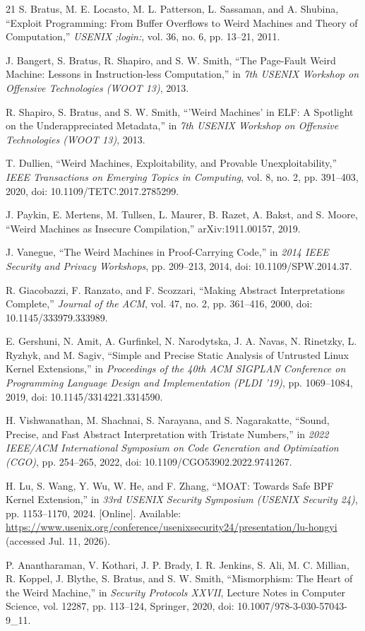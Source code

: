\documentclass[conference]{IEEEtran}
\begin{document}
\begin{thebibliography}{21}
S. Bratus, M. E. Locasto, M. L. Patterson, L. Sassaman, and A. Shubina, ``Exploit Programming: From Buffer Overflows to Weird Machines and Theory of Computation,'' \emph{USENIX ;login:}, vol. 36, no. 6, pp. 13--21, 2011.

J. Bangert, S. Bratus, R. Shapiro, and S. W. Smith, ``The Page-Fault Weird Machine: Lessons in Instruction-less Computation,'' in \emph{7th USENIX Workshop on Offensive Technologies (WOOT 13)}, 2013.

R. Shapiro, S. Bratus, and S. W. Smith, ``'Weird Machines' in ELF: A Spotlight on the Underappreciated Metadata,'' in \emph{7th USENIX Workshop on Offensive Technologies (WOOT 13)}, 2013.

T. Dullien, ``Weird Machines, Exploitability, and Provable Unexploitability,'' \emph{IEEE Transactions on Emerging Topics in Computing}, vol. 8, no. 2, pp. 391--403, 2020, doi: 10.1109/TETC.2017.2785299.

J. Paykin, E. Mertens, M. Tullsen, L. Maurer, B. Razet, A. Bakst, and S. Moore, ``Weird Machines as Insecure Compilation,'' arXiv:1911.00157, 2019.

J. Vanegue, ``The Weird Machines in Proof-Carrying Code,'' in \emph{2014 IEEE Security and Privacy Workshops}, pp. 209--213, 2014, doi: 10.1109/SPW.2014.37.

R. Giacobazzi, F. Ranzato, and F. Scozzari, ``Making Abstract Interpretations Complete,'' \emph{Journal of the ACM}, vol. 47, no. 2, pp. 361--416, 2000, doi: 10.1145/333979.333989.

E. Gershuni, N. Amit, A. Gurfinkel, N. Narodytska, J. A. Navas, N. Rinetzky, L. Ryzhyk, and M. Sagiv, ``Simple and Precise Static Analysis of Untrusted Linux Kernel Extensions,'' in \emph{Proceedings of the 40th ACM SIGPLAN Conference on Programming Language Design and Implementation (PLDI '19)}, pp. 1069--1084, 2019, doi: 10.1145/3314221.3314590.

H. Vishwanathan, M. Shachnai, S. Narayana, and S. Nagarakatte, ``Sound, Precise, and Fast Abstract Interpretation with Tristate Numbers,'' in \emph{2022 IEEE/ACM International Symposium on Code Generation and Optimization (CGO)}, pp. 254--265, 2022, doi: 10.1109/CGO53902.2022.9741267.

H. Lu, S. Wang, Y. Wu, W. He, and F. Zhang, ``MOAT: Towards Safe BPF Kernel Extension,'' in \emph{33rd USENIX Security Symposium (USENIX Security 24)}, pp. 1153--1170, 2024. [Online]. Available: \url{https://www.usenix.org/conference/usenixsecurity24/presentation/lu-hongyi} (accessed Jul. 11, 2026).

P. Anantharaman, V. Kothari, J. P. Brady, I. R. Jenkins, S. Ali, M. C. Millian, R. Koppel, J. Blythe, S. Bratus, and S. W. Smith, ``Mismorphism: The Heart of the Weird Machine,'' in \emph{Security Protocols XXVII}, Lecture Notes in Computer Science, vol. 12287, pp. 113--124, Springer, 2020, doi: 10.1007/978-3-030-57043-9\_11.

\end{thebibliography}
\end{document}
